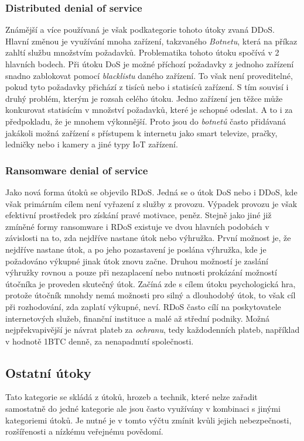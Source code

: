 \subsubsection{Distributed denial of service}
Známější a více používaná je však podkategorie tohoto útoky zvaná \ac{DDoS}.
Hlavní změnou je využívání mnoha zařízení, takzvaného \textit{Botnetu}, která na příkaz zahltí službu množstvím požadavků.
Problematika tohoto útoku spočívá v 2 hlavních bodech.
Při útoku \ac{DoS} je možné příchozí požadavky z jednoho zařízení snadno zablokovat pomocí \textit{blacklistu} daného zařízení.
To však není proveditelné, pokud tyto požadavky přichází z tisíců nebo i statisíců zařízení.
S tím souvisí i druhý problém, kterým je rozsah celého útoku.
Jedno zařízení jen těžce může konkurovat statisícím v množství požadavků, které je schopné odeslat.
A to i za předpokladu, že je mnohem výkonnější.
Proto jsou do \textit{botnetů} často přidávaná jakákoli možná zařízení s přístupem k internetu jako smart televize, pračky, ledničky nebo i kamery a jiné typy \ac{IoT} zařízení.\cite{cisco_most_common_attack}



\subsubsection{Ransomware denial of service}
Jako nová forma útoků se objevilo \ac{RDoS}.
Jedná se o útok \ac{DoS} nebo i \ac{DDoS}, kde však primárním cílem není vyřazení z služby z provozu.
Výpadek provozu je však efektivní prostředek pro získání pravé motivace, peněz.
Stejně jako jiné již zmíněné formy ransomware i \ac{RDoS} existuje ve dvou hlavních podobách v závislosti na to, zda nejdříve nastane útok nebo výhružka.
První možnost je, že nejdříve nastane útok, a po jeho pozastavení je poslána výhružka, kde je požadováno výkupné jinak útok znovu začne.
Druhou možností je zaslání výhružky rovnou a pouze při nezaplacení nebo nutnosti prokázání možností útočníka je proveden skutečný útok.
Začíná zde s cílem útoku psychologická hra, protože útočník mnohdy nemá možnosti pro silný a dlouhodobý útok, to však cíl při rozhodování, zda zaplatí výkupné, neví.
\ac{RDoS} často cílí na poskytovatele internetových služeb, finanční instituce a malé až střední podniky.
Možná nejpřekvapivější je návrat plateb za \textit{ochranu}, tedy každodenních plateb, například v hodnotě 1BTC denně, za nenapadnutí společnosti.\cite{Enisa_thread_landscape}


\subsection{Ostatní útoky}\label{subsec:ostatni-utoky}
Tato kategorie se skládá z útoků, hrozeb a technik, které nelze zařadit samostatně do jedné kategorie ale jsou často využívány v kombinaci s jinými kategoriemi útoků.
Je nutné je v tomto výčtu zmínit kvůli jejich nebezpečnosti, rozšířenosti a nízkému veřejnému povědomí.

